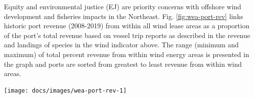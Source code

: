 \documentclass[
  10pt,
]{article}
\let\origfigure\figure
\let\endorigfigure\endfigure
\renewenvironment{figure}[1][2] {
    \expandafter\origfigure\expandafter[H]
} {
    \endorigfigure
}
\let\origtable\table
\let\endorigtable\endtable
\renewenvironment{table}[1][2] {
    \expandafter\origtable\expandafter[H]
} {
    \endorigtable
}
\begin{document}
\begin{table}

\caption{\label{tab:wind-survey-table}Survey mitigation planning.}
\centering
{}
\end{table}

Equity and environmental justice (EJ) are priority concerns with
offshore wind development and fisheries impacts in the Northeast. Fig.
\ref{fig:wea-port-rev} links historic port revenue (2008-2019) from
within all wind lease areas as a proportion of the port's total revenue
based on vessel trip reports as described in the revenue and landings of
species in the wind indicator above. The range (minimum and maximum) of
total percent revenue from within wind energy areas is presented in the
graph and ports are sorted from greatest to least revenue from within
wind areas.

\begin{figure}

\texttt{[image: docs/images/wea-port-rev-1]} \hfill{}

\caption{Percent of port revenue from Wind Energy Areas (WEA) in descending order from most to least port revenue from WEA. EJ = Environmental Justice.}\label{fig:wea-port-rev}
\end{figure}
\end{document}
